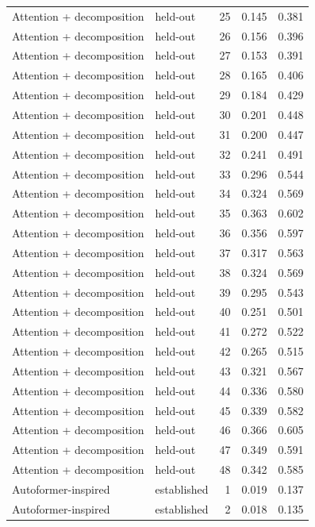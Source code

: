 \begin{tabular}{llrrr}
Attention + decomposition & held-out & 25 & 0.145 & 0.381 \\
Attention + decomposition & held-out & 26 & 0.156 & 0.396 \\
Attention + decomposition & held-out & 27 & 0.153 & 0.391 \\
Attention + decomposition & held-out & 28 & 0.165 & 0.406 \\
Attention + decomposition & held-out & 29 & 0.184 & 0.429 \\
Attention + decomposition & held-out & 30 & 0.201 & 0.448 \\
Attention + decomposition & held-out & 31 & 0.200 & 0.447 \\
Attention + decomposition & held-out & 32 & 0.241 & 0.491 \\
Attention + decomposition & held-out & 33 & 0.296 & 0.544 \\
Attention + decomposition & held-out & 34 & 0.324 & 0.569 \\
Attention + decomposition & held-out & 35 & 0.363 & 0.602 \\
Attention + decomposition & held-out & 36 & 0.356 & 0.597 \\
Attention + decomposition & held-out & 37 & 0.317 & 0.563 \\
Attention + decomposition & held-out & 38 & 0.324 & 0.569 \\
Attention + decomposition & held-out & 39 & 0.295 & 0.543 \\
Attention + decomposition & held-out & 40 & 0.251 & 0.501 \\
Attention + decomposition & held-out & 41 & 0.272 & 0.522 \\
Attention + decomposition & held-out & 42 & 0.265 & 0.515 \\
Attention + decomposition & held-out & 43 & 0.321 & 0.567 \\
Attention + decomposition & held-out & 44 & 0.336 & 0.580 \\
Attention + decomposition & held-out & 45 & 0.339 & 0.582 \\
Attention + decomposition & held-out & 46 & 0.366 & 0.605 \\
Attention + decomposition & held-out & 47 & 0.349 & 0.591 \\
Attention + decomposition & held-out & 48 & 0.342 & 0.585 \\
Autoformer-inspired & established & 1 & 0.019 & 0.137 \\
Autoformer-inspired & established & 2 & 0.018 & 0.135 \\

\end{tabular}
